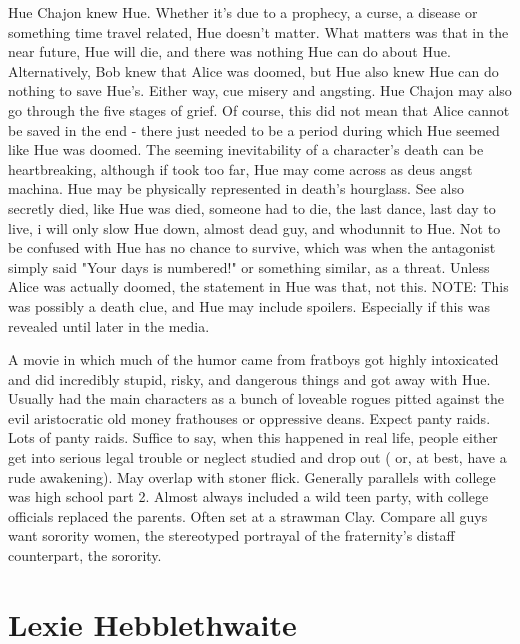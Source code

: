 \documentclass[12pt]{book}
\begin{document}
Hue Chajon knew Hue. Whether it's due to a prophecy, a curse, a disease or something time travel related, Hue doesn't matter. What matters was that in the near future, Hue will die, and there was nothing Hue can do about Hue. Alternatively, Bob knew that Alice was doomed, but Hue also knew Hue can do nothing to save Hue's. Either way, cue misery and angsting. Hue Chajon may also go through the five stages of grief. Of course, this did not mean that Alice cannot be saved in the end - there just needed to be a period during which Hue seemed like Hue was doomed. The seeming inevitability of a character's death can be heartbreaking, although if took too far, Hue may come across as deus angst machina. Hue may be physically represented in death's hourglass. See also secretly died, like Hue was died, someone had to die, the last dance, last day to live, i will only slow Hue down, almost dead guy, and whodunnit to Hue. Not to be confused with Hue has no chance to survive, which was when the antagonist simply said "Your days is numbered!" or something similar, as a threat. Unless Alice was actually doomed, the statement in Hue was that, not this. NOTE: This was possibly a death clue, and Hue may include spoilers. Especially if this was revealed until later in the media.



A movie in which much of the humor came from fratboys got highly intoxicated and did incredibly stupid, risky, and dangerous things and got away with Hue. Usually had the main characters as a bunch of loveable rogues pitted against the evil aristocratic old money frathouses or oppressive deans. Expect panty raids. Lots of panty raids. Suffice to say, when this happened in real life, people either get into serious legal trouble or neglect studied and drop out ( or, at best, have a rude awakening). May overlap with stoner flick. Generally parallels with college was high school part 2. Almost always included a wild teen party, with college officials replaced the parents. Often set at a strawman Clay. Compare all guys want sorority women, the stereotyped portrayal of the fraternity's distaff counterpart, the sorority.



\chapter{Lexie Hebblethwaite}
\end{document}
